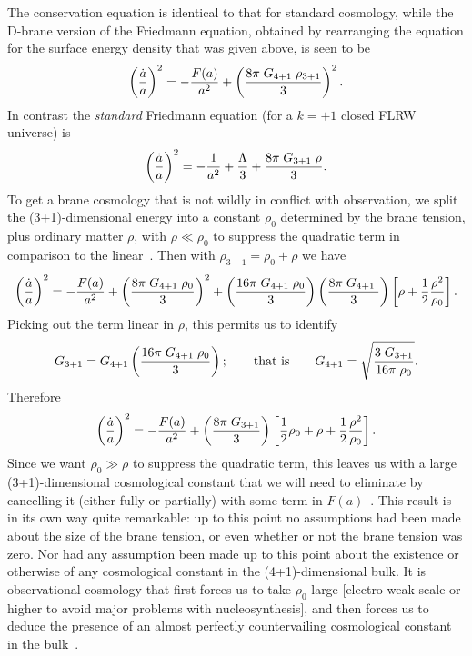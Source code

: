\documentclass[a4paper,12pt]{article}
\begin{document}
The conservation equation is identical to that for standard cosmology,
while the D-brane version of the Friedmann equation, obtained by
rearranging the equation for the surface energy density that was given
above, is seen to be
%
\begin{equation}
\left({\dot a \over a}\right)^2 = 
- {F(a)\over a^2} + \left({ 8\pi \; G_{4+1} \; \rho_{3+1}\over 3}\right)^2.
\end{equation}
%
In contrast the {\em standard} Friedmann equation (for a $k=+1$ closed
FLRW universe) is
%
\begin{equation}
\left({\dot a \over a}\right)^2 = 
- {1\over a^2} + {\Lambda\over3}+ { 8\pi \; G_{3+1} \; \rho\over 3}.
\end{equation}
%
To get a brane cosmology that is not wildly in conflict with
observation, we split the (3+1)-dimensional energy into a constant
$\rho_0$ determined by the brane tension, plus ordinary matter $\rho$,
with $\rho\ll\rho_0$ to suppress the quadratic term in comparison to
the linear~\cite{RS-cosmology}. Then with $\rho_{3+1} = \rho_0 + \rho$
we have
%
\begin{equation}
\left({\dot a \over a}\right)^2 = 
- {F(a)\over a^2} + 
\left({ 8\pi \; G_{4+1} \; \rho_0\over3}\right)^2  + 
\left({ 16\pi \; G_{4+1} \; \rho_0\over 3}\right)
\left({ 8\pi \; G_{4+1} \;\over 3}\right)  
\left[\rho + {1\over2} {\rho^2\over\rho_0}\right].
\end{equation}
%
Picking out the term linear in $\rho$, this permits us to identify
%
\begin{equation}
G_{3+1} = G_{4+1} \left({ 16\pi \; G_{4+1} \; \rho_0\over 3}\right); 
\qquad \hbox{that is} \qquad
G_{4+1} = \sqrt{3\;G_{3+1}\over16\pi\; \rho_0}.
\end{equation}
Therefore
%
\begin{equation}
\label{E:formal}
\left({\dot a \over a}\right)^2 = 
- {F(a)\over a^2} + 
\left({ 8\pi \; G_{3+1}\over3}\right) 
\left[{1\over2} \rho_0 + \rho + {1\over2} {\rho^2\over\rho_0} \right]. 
\end{equation}
%
Since we want $\rho_0\gg\rho$ to suppress the quadratic term, this
leaves us with a large (3+1)-dimensional cosmological constant that we
will need to eliminate by cancelling it (either fully or partially)
with some term in $F(a)$~\cite{RS-cosmology}.  This result is in its
own way quite remarkable: up to this point no assumptions had been
made about the size of the brane tension, or even whether or not the
brane tension was zero. Nor had any assumption been made up to this
point about the existence or otherwise of any cosmological constant
in the (4+1)-dimensional bulk. It is observational cosmology that
first forces us to take $\rho_0$ large [electro-weak scale or higher
to avoid major problems with nucleosynthesis], and then forces us to
deduce the presence of an almost perfectly countervailing cosmological
constant in the bulk~\cite{RS-cosmology}.
\end{document}
